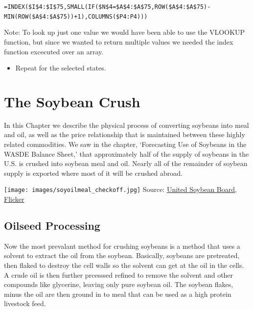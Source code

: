 \documentclass[
]{book}
\providecommand{\tightlist}{%
  \setlength{\itemsep}{0pt}\setlength{\parskip}{0pt}}
\begin{document}
\texttt{=INDEX(\$I\$4:\$I\$75,SMALL(IF(\$N\$4=\$A\$4:\$A\$75,ROW(\$A\$4:\$A\$75)-MIN(ROW(\$A\$4:\$A\$75))+1),COLUMNS(\$P4:P4)))}

Note: To look up just one value we would have been able to use the VLOOKUP function, but since we wanted to return multiple values we needed the index function excecuted over an array.

\begin{itemize}
\tightlist
\item
  Repeat for the selected states.
\end{itemize}

\hypertarget{the-soybean-crush}{%
\chapter{The Soybean Crush}\label{the-soybean-crush}}

In this Chapter we describe the physical process of converting soybeans into meal and oil, as well as the price relationship that is maintained between these highly related commodities. We saw in the chapter, `Forecasting Use of Soybeans in the WASDE Balance Sheet,' that approximately half of the supply of soybeans in the U.S. is crushed into soybean meal and oil. Nearly all of the remainder of soybean supply is exported where most of it will be crushed abroad.

\texttt{[image: images/soyoilmeal\_checkoff.jpg]}
Source: \href{http://unitedsoybean.org/}{United Soybean Board}, \href{https://www.flickr.com/photos/unitedsoybean/10059732523/in/photolist-gjWL1c-iSHsD6-gjRZN5-gjSiez-gjRDSm-3GTus-gjT5Pf-gjT5FQ-gjT5Zf-iRrGux-5mxrJp-iRuCDS-fEhEb4-iSHt56-gjSLAj-gjTptX-gjSLDL-gjSNeR-gjSLEC-gjT72q-6m2BCX-gjSUHT-gjTpzi-6m6Jay-qBtpPq-5wBq3U-gjWLbe-aMpXNc-qRDdLA-gjWY8m-rujuvk-iRqECD-rNDaeg-GL7Qd-6m2Yyc-6JGi4H-ar3khU-cNjfUf-6m2A3g-aE4dw4-c3VUt9-c3VVq5-4JzMWS-6KY45z-6m2Xsv-6m6Eny-6m2XZg-6m2WVa-6m2ZFF-6m7ad1}{Flicker}

\hypertarget{oilseed-processing}{%
\section{Oilseed Processing}\label{oilseed-processing}}

Now the most prevalant method for crushing soybeans is a method that uses a solvent to extract the oil from the soybean. Basically, soybeans are pretreated, then flaked to destroy the cell walls so the solvent can get at the oil in the cells. A crude oil is then further prcesssed refined to remove the solvent and other compounds like glycerine, leaving only pure soybean oil. The soybean flakes, minus the oil are then ground in to meal that can be used as a high protein livestock feed.
\end{document}
